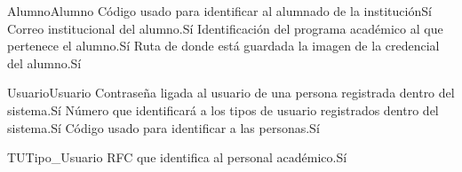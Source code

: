\begin{cdtEntidad}{Alumno}{Alumno}
	{Código usado para identificar al alumnado de la institución}{Sí}
	{Correo institucional del alumno.}{Sí}
	{Identificación del programa académico al que pertenece el alumno.}{Sí}
	{Ruta de donde está guardada la imagen de la credencial del alumno.}{Sí}
\end{cdtEntidad}
\begin{cdtEntidad}{Usuario}{Usuario}
	{Contraseña ligada al usuario de una persona registrada dentro del sistema.}{Sí}
	{Número que identificará a los tipos de usuario registrados dentro del sistema.}{Sí}
	{Código usado para identificar a las personas.}{Sí}
\end{cdtEntidad}
\begin{cdtEntidad}{TU}{Tipo\_Usuario}
	{RFC que identifica al personal académico.}{Sí}
\end{cdtEntidad}
